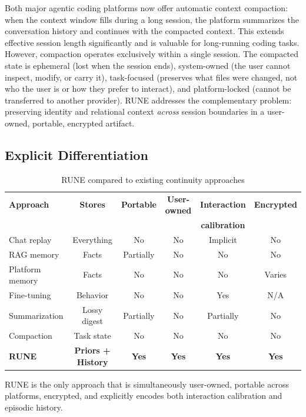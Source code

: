 \documentclass[11pt,a4paper]{article}
\begin{document}
Both major agentic coding platforms now offer automatic context compaction: when the context window fills during a long session, the platform summarizes the conversation history and continues with the compacted context. This extends effective session length significantly and is valuable for long-running coding tasks. However, compaction operates exclusively within a single session. The compacted state is ephemeral (lost when the session ends), system-owned (the user cannot inspect, modify, or carry it), task-focused (preserves what files were changed, not who the user is or how they prefer to interact), and platform-locked (cannot be transferred to another provider). RUNE addresses the complementary problem: preserving identity and relational context \textit{across} session boundaries in a user-owned, portable, encrypted artifact.

\subsection{Explicit Differentiation}

\begin{table}[H]
\centering
\caption{RUNE compared to existing continuity approaches}
\begin{tabular}{lccccc}
\toprule
\textbf{Approach} & \textbf{Stores} & \textbf{Portable} & \textbf{User-owned} & \textbf{Interaction} & \textbf{Encrypted} \\
 & & & & \textbf{calibration} & \\
\midrule
Chat replay & Everything & No & No & Implicit & No \\
RAG memory & Facts & Partially & No & No & No \\
Platform memory & Facts & No & No & No & Varies \\
Fine-tuning & Behavior & No & No & Yes & N/A \\
Summarization & Lossy digest & Partially & No & Partially & No \\
Compaction & Task state & No & No & No & No \\
\textbf{RUNE} & \textbf{Priors + History} & \textbf{Yes} & \textbf{Yes} & \textbf{Yes} & \textbf{Yes} \\
\bottomrule
\end{tabular}
\end{table}

RUNE is the only approach that is simultaneously user-owned, portable across platforms, encrypted, and explicitly encodes both interaction calibration and episodic history.
\end{document}
